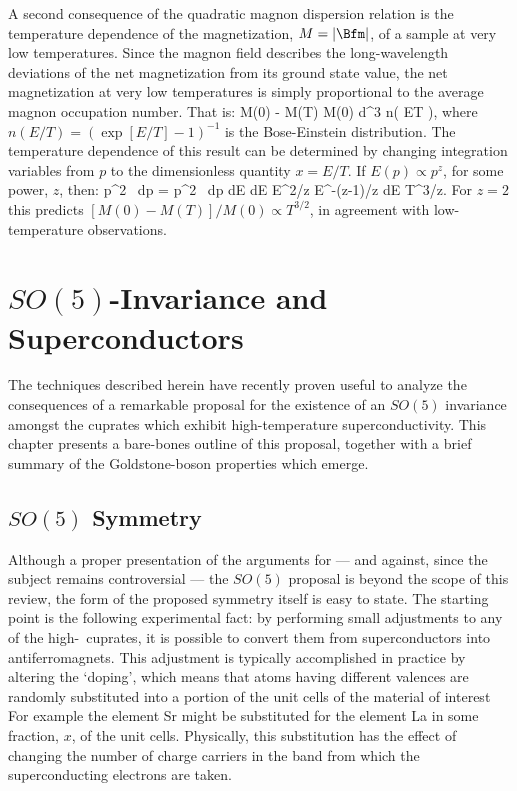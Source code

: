 A second consequence of the quadratic magnon dispersion
relation is the temperature dependence of the
magnetization, $M = |\Bfm|$, of a sample at very low
temperatures. Since the magnon field describes the
long-wavelength deviations of the net magnetization from
its ground state value, the net magnetization at very low
temperatures is simply proportional to the average magnon
occupation number. That is:
%
\eq
\label{lowtmagnetization}
M(0) - M(T)  \propto M(0) \; \int 
d^3\bfp \; n\left( {E\over T} \right),
\eeq
%
where $n(E/T) = (\exp[E/T] - 1)^{-1}$ is the Bose-Einstein
distribution. The temperature dependence of this result can
be determined by changing integration variables from $p$ to
the dimensionless quantity $x = E/T$. If $E(p) \propto
p^z$, for some power, $z$, then:
%
\eq
\label{scalinglaws}
p^2 \, dp = p^2 \, {dp \over dE} \; 
dE \propto E^{2/z} \; E^{-(z-1)/z} \; dE
\propto T^{3/z}.
\eeq
%
For $z = 2$ this predicts $[M(0) - M(T)]/M(0) \propto
T^{3/2}$, in agreement with low-temperature observations.

\chapter{$SO(5)$-Invariance and Superconductors}

The techniques described herein have recently proven useful
to analyze the consequences of a remarkable  proposal for
the existence of an $SO(5)$ invariance  amongst the
cuprates which exhibit high-temperature superconductivity.
This chapter presents a bare-bones outline of this
proposal, together with a brief summary of the
Goldstone-boson properties which emerge.

\section{$SO(5)$ Symmetry}

Although a proper presentation of the arguments  for ---
and against, since the subject remains controversial ---
the $SO(5)$ proposal is beyond the scope of this review, 
the form of the proposed symmetry itself is easy
to state. The starting point is the following experimental
fact: by performing small adjustments to any of the
high-\Tc\ cuprates, it is possible to convert them from
superconductors into antiferromagnets. This adjustment
is typically accomplished in practice
by altering the `doping', which means that
atoms having different valences are randomly substituted 
into a portion of the unit cells of the material of interest
For example the element Sr might be substituted
for the element La in some fraction, $x$, of the unit cells. 
Physically, this substitution
has the effect of changing the number of charge carriers 
in the band from which  the
superconducting electrons are taken. 


